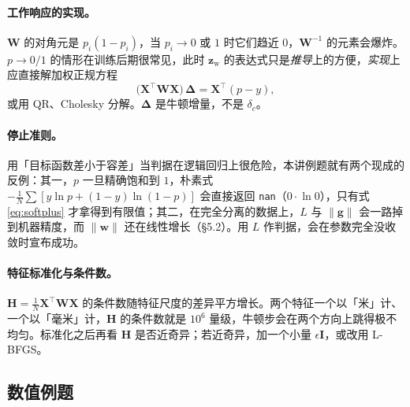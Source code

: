 \documentclass[11pt,a4paper,fontset=windows,zihao=-4]{ctexart}
\newcommand{\bX}{\mathbf{X}}
\newcommand{\bw}{\mathbf{w}}
\newcommand{\bz}{\mathbf{z}}
\newcommand{\bg}{\mathbf{g}}
\newcommand{\bI}{\mathbf{I}}
\newcommand{\bH}{\mathbf{H}}
\newcommand{\bW}{\mathbf{W}}
\newcommand{\bDelta}{\boldsymbol{\Delta}}
\newcommand{\tp}{^{\top}}
\newcommand{\norm}[1]{\lVert #1\rVert}
\begin{document}
\paragraph{工作响应的实现。}$\bW$ 的对角元是 $p_i(1-p_i)$，当 $p_i\to0$ 或 $1$ 时它们趋近 $0$，$\bW^{-1}$ 的元素会爆炸。$p\to0/1$ 的情形在训练后期很常见，此时 $\bz_{\mathrm w}$ 的表达式只是\emph{推导}上的方便，\emph{实现}上应直接解加权正规方程
\begin{equation}
  \bigl(\bX\tp\bW\bX\bigr)\,\bDelta=\bX\tp(p-y),
\end{equation}
或用 QR、Cholesky 分解。$\bDelta$ 是牛顿增量，不是 $\delta_c$。

\paragraph{停止准则。}用「目标函数差小于容差」当判据在逻辑回归上很危险，本讲例题就有两个现成的反例：其一，$p$ 一旦精确饱和到 $1$，朴素式 $-\frac1N\sum[y\ln p+(1-y)\ln(1-p)]$ 会直接返回 \texttt{nan}（$0\cdot\ln0$），只有式 \eqref{eq:softplus} 才拿得到有限值；其二，在完全分离的数据上，$L$ 与 $\norm{\bg}$ 会一路掉到机器精度，而 $\norm{\bw}$ 还在线性增长（\S5.2）。用 $L$ 作判据，会在参数完全没收敛时宣布成功。

\paragraph{特征标准化与条件数。}$\bH=\frac1N\bX\tp\bW\bX$ 的条件数随特征尺度的差异平方增长。两个特征一个以「米」计、一个以「毫米」计，$\bH$ 的条件数就是 $10^{6}$ 量级，牛顿步会在两个方向上跳得极不均匀。标准化之后再看 $\bH$ 是否近奇异；若近奇异，加一个小量 $\epsilon\bI$，或改用 L-BFGS。

\subsection{数值例题}
\end{document}
